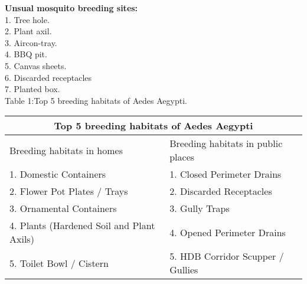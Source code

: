 \documentclass[11pt]{exam}
\begin{document}
\begin{questions}
  \textbf{Unsual mosquito breeding sites:\\} 
  1. Tree hole. \\
  2. Plant axil. \\
  3. Aircon-tray. \\
  4. BBQ pit. \\
  5. Canvas sheets. \\
  6. Discarded receptacles \\
  7. Planted box. \\

Table 1:Top 5 breeding habitats of Aedes Aegypti. \\

\begin{tabular}{ |p{7cm}|p{7cm}| }
\hline
\multicolumn{2}{|c|}{\textbf{Top 5 breeding habitats of Aedes Aegypti}} \\
\hline
Breeding habitats in homes & Breeding habitats in public places   \\
\hline
1. Domestic Containers & 1. Closed Perimeter Drains\\
2. Flower Pot Plates / Trays & 2. Discarded Receptacles\\
3. Ornamental Containers & 3. Gully Traps \\
4. Plants (Hardened Soil and Plant Axils) & 4. Opened Perimeter Drains\\
5. Toilet Bowl / Cistern & 5. HDB Corridor Scupper / Gullies \\
\hline
\end{tabular} \\ \\


\end{questions}
\end{document}
